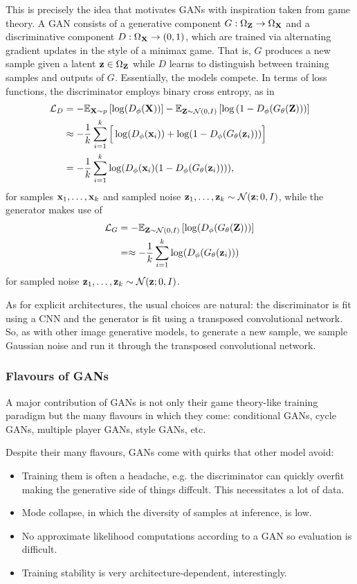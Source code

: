 \documentclass[11pt]{article}
\begin{document}
This is precisely the idea that motivates GANs with inspiration taken from game theory. A GAN consists of a generative component $G:\Omega_{\mathbf{Z}}\to\Omega_{\mathbf{X}}$ and a discriminative component $D:\Omega_{\mathbf{X}}\to(0,1)$, which are trained via alternating gradient updates in the style of a minimax game. That is, $G$ produces a new sample given a latent $\mathbf{z}\in\Omega_{\mathbf{Z}}$ while $D$ learns to distinguish between training samples and outputs of $G$. Essentially, the models compete. In terms of loss functions, the discriminator employs binary cross entropy, as in
\begin{align*}    
    \mathcal{L}_D
    &=
    -\mathbb{E}_{\mathbf{X}\sim p}\left[\log(D_{\phi}(\mathbf{X}))\right]-\mathbb{E}_{\mathbf{Z}\sim\mathcal{N}(0,I)}\left[\log\left(1-D_{\phi}(G_{\theta}(\mathbf{Z}))\right)\right]\\
    &\approx
    -\frac{1}{k}\sum_{i=1}^k\Big[\log(D_{\phi}(\mathbf{x}_i))+\log(1-D_{\phi}(G_{\theta}(\mathbf{z}_i)))\Big]\\
    &=
    -\frac{1}{k}\sum_{i=1}^k\log(D_{\phi}(\mathbf{x}_i)(1-D_{\phi}(G_{\theta}(\mathbf{z}_i)))),
\end{align*}
for samples $\mathbf{x}_1,\dots,\mathbf{x}_k$ and sampled noise $\mathbf{z}_1,\dots,\mathbf{z}_k\sim\mathcal{N}(\mathbf{z};0,I)$, while the generator makes use of
\begin{align*}
    \mathcal{L}_G
    &=
    -\mathbb{E}_{\mathbf{Z}\sim\mathcal{N}(0,I)}\left[\log(D_{\phi}(G_{\theta}(\mathbf{Z})))\right]\\
    &=\approx
    -\frac{1}{k}\sum_{i=1}^k\log(D_{\phi}(G_{\theta}(\mathbf{z}_i)))
\end{align*}
for sampled noise $\mathbf{z}_1,\dots,\mathbf{z}_k\sim\mathcal{N}(\mathbf{z};0,I)$.

As for explicit architectures, the usual choices are natural: the discriminator is fit using a CNN and the generator is fit using a transposed convolutional network. So, as with other image generative models, to generate a new sample, we sample Gaussian noise and run it through the transposed convolutional network.

\subsubsection{\NEXT Flavours of GANs}
A major contribution of GANs is not only their game theory-like training paradigm but the many flavours in which they come: conditional GANs, cycle GANs, multiple player GANs, style GANs, etc.

Despite their many flavours, GANs come with quirks that other model avoid:
\begin{itemize}
    \item[--] Training them is often a headache, e.g. the discriminator can quickly overfit making the generative side of things diffcult. This necessitates a lot of data.
    \item[--] Mode collapse, in which the diversity of samples at inference, is low.
    \item[--] No approximate likelihood computations according to a GAN so evaluation is difficult.
    \item[--] Training stability is very architecture-dependent, interestingly.
\end{itemize}
\end{document}
